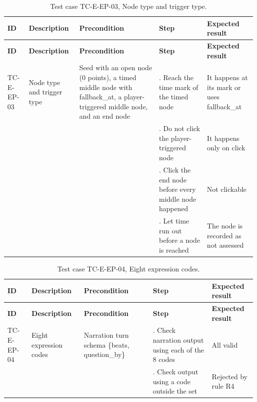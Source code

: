 {\small
\begin{longtable}{|>{\raggedright\arraybackslash}p{}|>{\raggedright\arraybackslash}p{}|>{\raggedright\arraybackslash}p{}|>{\raggedright\arraybackslash}p{}|>{\raggedright\arraybackslash}p{}|}
\caption{Test case TC-E-EP-03, Node type and trigger type.} \\
\hline
\textbf{ID} & \textbf{Description} & \textbf{Precondition} & \textbf{Step} & \textbf{Expected result} \\ \hline
\endfirsthead
\hline
\textbf{ID} & \textbf{Description} & \textbf{Precondition} & \textbf{Step} & \textbf{Expected result} \\ \hline
\endhead
TC-E-EP-03 & Node type and trigger type & Seed with an open node (0 points), a timed middle node with fallback\_at, a player-triggered middle node, and an end node & 1. Reach the time mark of the timed node & It happens at its mark or uses fallback\_at \\ \hline
 &  &  & 2. Do not click the player-triggered node & It happens only on click \\ \hline
 &  &  & 3. Click the end node before every middle node happened & Not clickable \\ \hline
 &  &  & 4. Let time run out before a node is reached & The node is recorded as not assessed \\ \hline
\end{longtable}
}

{\small
\begin{longtable}{|>{\raggedright\arraybackslash}p{}|>{\raggedright\arraybackslash}p{}|>{\raggedright\arraybackslash}p{}|>{\raggedright\arraybackslash}p{}|>{\raggedright\arraybackslash}p{}|}
\caption{Test case TC-E-EP-04, Eight expression codes.} \\
\hline
\textbf{ID} & \textbf{Description} & \textbf{Precondition} & \textbf{Step} & \textbf{Expected result} \\ \hline
\endfirsthead
\hline
\textbf{ID} & \textbf{Description} & \textbf{Precondition} & \textbf{Step} & \textbf{Expected result} \\ \hline
\endhead
TC-E-EP-04 & Eight expression codes & Narration turn schema \{beats, question\_by\} & 1. Check narration output using each of the 8 codes & All valid \\ \hline
 &  &  & 2. Check output using a code outside the set & Rejected by rule R4 \\ \hline
\end{longtable}
}


